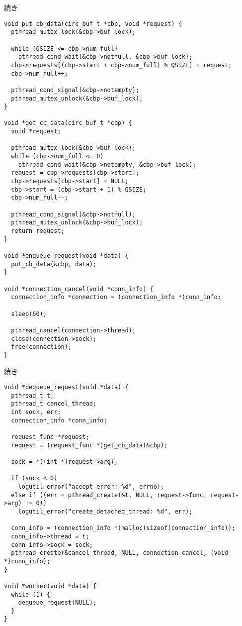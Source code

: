 \documentclass[10pt]{jarticle}
\begin{document}
\newpage

\begin{itembox}[l]{続き}
  \begin{verbatim}
void put_cb_data(circ_buf_t *cbp, void *request) {
  pthread_mutex_lock(&cbp->buf_lock);

  while (QSIZE <= cbp->num_full)
    pthread_cond_wait(&cbp->notfull, &cbp->buf_lock);
  cbp->requests[(cbp->start + cbp->num_full) % QSIZE] = request;
  cbp->num_full++;

  pthread_cond_signal(&cbp->notempty);
  pthread_mutex_unlock(&cbp->buf_lock);
}

void *get_cb_data(circ_buf_t *cbp) {
  void *request;

  pthread_mutex_lock(&cbp->buf_lock);
  while (cbp->num_full <= 0)
    pthread_cond_wait(&cbp->notempty, &cbp->buf_lock);
  request = cbp->requests[cbp->start];
  cbp->requests[cbp->start] = NULL;
  cbp->start = (cbp->start + 1) % QSIZE;
  cbp->num_full--;

  pthread_cond_signal(&cbp->notfull);
  pthread_mutex_unlock(&cbp->buf_lock);
  return request;
}

void *enqueue_request(void *data) {
  put_cb_data(&cbp, data);
}

void *connection_cancel(void *conn_info) {
  connection_info *connection = (connection_info *)conn_info;

  sleep(60);

  pthread_cancel(connection->thread);
  close(connection->sock);
  free(connection);
}
  \end{verbatim}
\end{itembox}

\newpage

\begin{itembox}[l]{続き}
  \begin{verbatim}
void *dequeue_request(void *data) {
  pthread_t t;
  pthread_t cancel_thread;
  int sock, err;
  connection_info *conn_info;

  request_func *request;
  request = (request_func *)get_cb_data(&cbp);

  sock = *((int *)request->arg);

  if (sock < 0)
    logutil_error("accept error: %d", errno);
  else if ((err = pthread_create(&t, NULL, request->func, request->arg) != 0))
    logutil_error("create_detached_thread: %d", err);

  conn_info = (connection_info *)malloc(sizeof(connection_info));
  conn_info->thread = t;
  conn_info->sock = sock;
  pthread_create(&cancel_thread, NULL, connection_cancel, (void *)conn_info);
}

void *worker(void *data) {
  while (1) {
    dequeue_request(NULL);
  }
}
  \end{verbatim}
\end{itembox}
\end{document}
